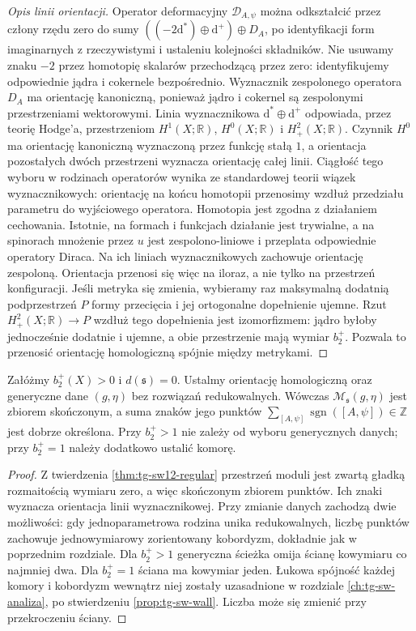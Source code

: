 \begin{proof}[Opis linii orientacji]
Operator deformacyjny $\mathcal D_{A,\psi}$ można odkształcić
przez człony rzędu zero do sumy
$((-2\mathrm d^*)\oplus\mathrm d^+)\oplus D_A$,
po identyfikacji form imaginarnych z rzeczywistymi
i ustaleniu kolejności składników.
Nie usuwamy znaku $-2$ przez homotopię skalarów
przechodzącą przez zero: identyfikujemy
odpowiednie jądra i cokernele bezpośrednio.
Wyznacznik zespolonego operatora $D_A$ ma orientację
kanoniczną, ponieważ jądro i cokernel są zespolonymi
przestrzeniami wektorowymi. Linia wyznacznikowa
$\mathrm d^*\oplus\mathrm d^+$ odpowiada, przez teorię
Hodge'a, przestrzeniom
$H^1(X;\mathbb R)$, $H^0(X;\mathbb R)$ i $H^2_+(X;\mathbb R)$.
Czynnik $H^0$ ma orientację kanoniczną wyznaczoną przez
funkcję stałą $1$, a orientacja pozostałych dwóch
przestrzeni wyznacza orientację całej linii.
Ciągłość tego wyboru w rodzinach operatorów wynika
ze standardowej teorii wiązek wyznacznikowych:
orientację na końcu homotopii przenosimy
wzdłuż przedziału parametru do wyjściowego operatora.
Homotopia jest zgodna z działaniem cechowania.
Istotnie, na formach i funkcjach działanie
jest trywialne, a na spinorach mnożenie przez
$u$ jest zespolono-liniowe i przeplata
odpowiednie operatory Diraca. Na ich liniach
wyznacznikowych zachowuje orientację zespoloną.
Orientacja przenosi się więc na iloraz,
a nie tylko na przestrzeń konfiguracji.
Jeśli metryka się zmienia, wybieramy raz
maksymalną dodatnią podprzestrzeń $P$ formy
przecięcia i jej ortogonalne dopełnienie ujemne.
Rzut $H^2_+(X;\mathbb R)\to P$ wzdłuż
tego dopełnienia jest izomorfizmem:
jądro byłoby jednocześnie dodatnie i ujemne,
a obie przestrzenie mają wymiar $b_2^+$.
Pozwala to przenosić orientację homologiczną
spójnie między metrykami.
\end{proof}

\begin{stwierdzenie}
\label{prop:tg-sw12-count}
Załóżmy $b_2^+(X)>0$ i $d(\mathfrak s)=0$.
Ustalmy orientację homologiczną oraz generyczne dane
$(g,\eta)$ bez rozwiązań redukowalnych. Wówczas
$\mathcal M_{\mathfrak s}(g,\eta)$ jest zbiorem skończonym,
a suma znaków jego punktów
$\sum_{[A,\psi]}\operatorname{sgn}([A,\psi])\in\mathbb Z$
jest dobrze określona. Przy $b_2^+>1$ nie zależy
od wyboru generycznych danych; przy $b_2^+=1$
należy dodatkowo ustalić komorę.
\end{stwierdzenie}

\begin{proof}
Z twierdzenia \ref{thm:tg-sw12-regular} przestrzeń moduli jest
zwartą gładką rozmaitością wymiaru zero, a więc
skończonym zbiorem punktów. Ich znaki wyznacza
orientacja linii wyznacznikowej. Przy zmianie danych
zachodzą dwie możliwości: gdy jednoparametrowa rodzina
unika redukowalnych, liczbę punktów zachowuje
jednowymiarowy zorientowany kobordyzm, dokładnie jak
w poprzednim rozdziale. Dla $b_2^+>1$ generyczna
ścieżka omija ścianę kowymiaru co najmniej dwa.
Dla $b_2^+=1$ ściana ma kowymiar jeden.
Łukowa spójność każdej komory i kobordyzm
wewnątrz niej zostały uzasadnione w rozdziale
\ref{ch:tg-sw-analiza}, po stwierdzeniu
\ref{prop:tg-sw-wall}. Liczba może się zmienić
przy przekroczeniu ściany.
\end{proof}

